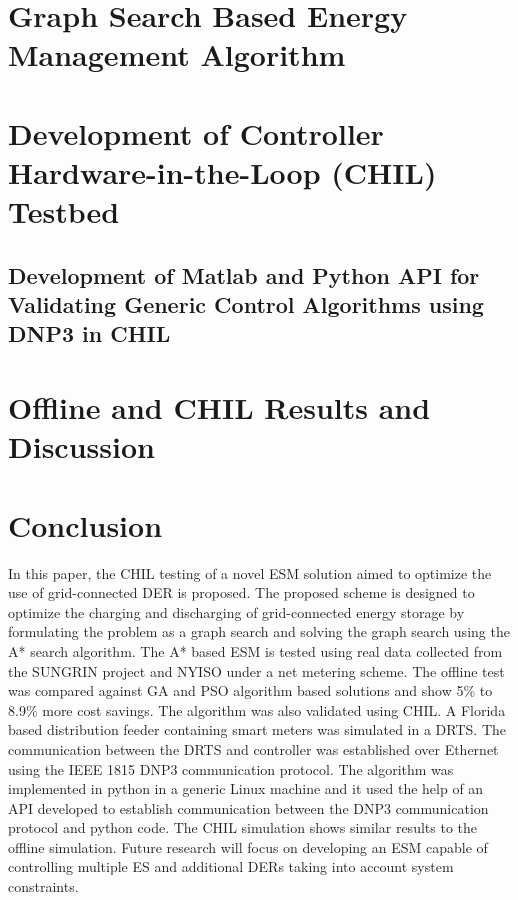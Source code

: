 \documentclass[journal]{IEEEtran}
\begin{document}
\section{Graph Search Based Energy Management Algorithm}


\section{Development of Controller Hardware-in-the-Loop (CHIL) Testbed} \label{SEC:TB}


\subsection{Development of Matlab and Python API for Validating Generic Control Algorithms using DNP3 in CHIL}\label{SEC:API_DNM3}


\section{Offline and CHIL Results and Discussion}





\section{Conclusion}
In this paper, the CHIL testing of a novel ESM solution aimed to optimize the use of grid-connected DER is proposed. The proposed scheme is designed to optimize the charging and discharging of grid-connected energy storage by formulating the problem as a graph search and solving the graph search using the A* search algorithm. The A* based ESM is tested using real data collected from the SUNGRIN project and NYISO under a net metering scheme. The offline test was compared against GA and PSO algorithm based solutions and show 5\% to 8.9\% more cost savings. The algorithm was also validated using CHIL. A Florida based distribution feeder containing smart meters was simulated in a DRTS. The communication between the DRTS and controller was established over Ethernet using the IEEE 1815 DNP3 communication protocol. The algorithm was implemented in python in a generic Linux machine and it used the help of an API developed to establish communication between the DNP3 communication protocol and python code. The CHIL simulation shows similar results to the offline simulation. Future research will focus on developing an ESM capable of controlling multiple ES and additional DERs taking into account system constraints.
\end{document}
